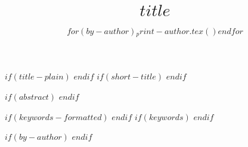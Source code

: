 
\author{$for(by-author)$$_print-author.tex()$$endfor$}

\title{$title$}
$if(title-plain)$
$endif$
$if(short-title)$
$endif$

$if(abstract)$
$endif$

$if(keywords-formatted)$
$endif$
$if(keywords)$
$endif$


$if(by-author)$
$endif$
